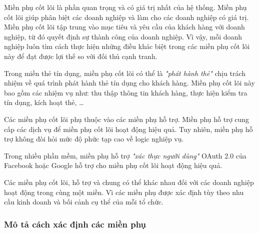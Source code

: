 
Miền phụ cốt lõi là phần quan trọng và có giá trị nhất của hệ thống. Miền phụ cốt lõi giúp phân biệt các doanh nghiệp và làm cho các doanh nghiệp có giá trị. Miền phụ cốt lõi tập trung vào mục tiêu và yêu cầu của khách hàng với doanh nghiệp, từ đó quyết định sự thành công của doanh nghiệp. Vì vậy, mỗi doanh nghiệp luôn tìm cách thực hiện những điều khác biệt trong các miền phụ cốt lõi này để đạt được lợi thế so với đối thủ cạnh tranh.

\begin{example} Trong miền thẻ tín dụng, miền phụ cốt lõi có thể là \textit{"phát hành thẻ"} chịu trách nhiệm về quá trình phát hành thẻ tín dụng cho khách hàng. Miền phụ cốt lõi này bao gồm các nhiệm vụ như: thu thập thông tin khách hàng, thực hiện kiểm tra tín dụng, kích hoạt thẻ, \dots

\end{example}


Các miền phụ cốt lõi phụ thuộc vào các miền phụ hỗ trợ. Miền phụ hỗ trợ cung cấp các dịch vụ để miền phụ cốt lõi hoạt động hiệu quả. Tuy nhiên, miền phụ hỗ trợ không đòi hỏi mức độ phức tạp cao về logic nghiệp vụ.

\begin{example} Trong nhiều phần mềm, miền phụ hỗ trợ \textit{"xác thực người dùng"} OAuth 2.0 của Facebook hoặc Google hỗ trợ cho miền phụ cốt lõi hoạt động hiệu quả.

\end{example}


Các miền phụ cốt lõi, hỗ trợ và chung có thể khác nhau đối với các doanh nghiệp hoạt động trong cùng một miền. Vì các miền phụ được xác định tùy theo nhu cầu kinh doanh và bối cảnh cụ thể của mỗi tổ chức.

\subsubsection{Mô tả cách xác định các miền phụ}

